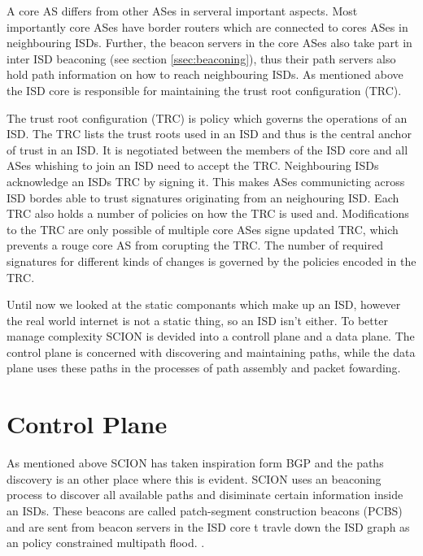 \documentclass[../eva1_scion.tex]{subfiles}
\begin{document}
    A core AS differs from other ASes in serveral important aspects. Most importantly core ASes have border routers which are connected to cores ASes in neighbouring ISDs. Further, the beacon servers in the core ASes also take part in inter ISD beaconing (see section \ref{ssec:beaconing}), thus their path servers also hold path information on how to reach neighbouring ISDs. As mentioned above the ISD core is responsible for maintaining the trust root configuration (TRC).

    The trust root configuration (TRC) is policy which governs the operations of an ISD. The TRC lists the trust roots used in an ISD and thus is the central anchor of trust in an ISD. It is negotiated between the members of the ISD core and all ASes whishing to join an ISD need to accept the TRC. Neighbouring ISDs acknowledge an ISDs TRC by signing it. This makes ASes communicting across ISD bordes able to trust signatures originating from an neighouring ISD. Each TRC also holds a number of policies on how the TRC is used and. Modifications to the TRC are only possible of multiple core ASes signe updated TRC, which prevents a rouge core AS from corupting the TRC. The number of required signatures for different kinds of changes is governed by the policies encoded in the TRC.

    Until now we looked at the static componants which make up an ISD, however the real world internet is not a static thing, so an ISD isn't either. To better manage complexity SCION is devided into a controll plane and a data plane. The control plane is concerned with discovering and maintaining paths, while the data plane uses these paths in the processes of path assembly and packet fowarding.

    \section{Control Plane}
    As mentioned above SCION has taken inspiration form BGP and the paths discovery is an other place where this is evident. SCION uses an beaconing process to discover all available paths and disiminate certain information inside an ISDs.  These beacons are called patch-segment construction beacons (PCBS) and are  sent from beacon servers in the ISD core t travle down the ISD graph as an policy constrained multipath flood. \cite{scion_2011}.
\end{document}
